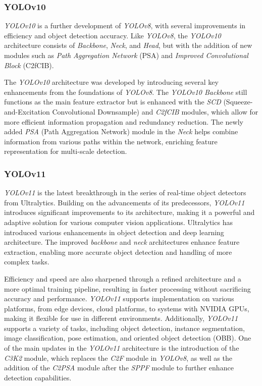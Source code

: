 \vspace{5pt}
\subsubsection{YOLOv10}
\label{subsubsec:YOLOv10}

\emph{YOLOv10} is a further development of \emph{YOLOv8}, with several improvements in efficiency and object detection accuracy. Like \emph{YOLOv8}, the \emph{YOLOv10} architecture consists of \emph{Backbone}, \emph{Neck}, and \emph{Head}, but with the addition of new modules such as \emph{Path Aggregation Network} (PSA) and \emph{Improved Convolutional Block} (C2fCIB).

The \emph{YOLOv10} architecture was developed by introducing several key enhancements from the foundations of \emph{YOLOv8}. The \emph{YOLOv10 Backbone} still functions as the main feature extractor but is enhanced with the \emph{SCD} (Squeeze-and-Excitation Convolutional Downsample) and \emph{C2fCIB} modules, which allow for more efficient information propagation and redundancy reduction. The newly added \emph{PSA} (Path Aggregation Network) module in the \emph{Neck} helps combine information from various paths within the network, enriching feature representation for multi-scale detection.

\vspace{5pt}
\subsubsection{YOLOv11}
\label{subsubsec:YOLOv11}

\emph{YOLOv11} is the latest breakthrough in the series of real-time object detectors from Ultralytics. Building on the advancements of its predecessors, \emph{YOLOv11} introduces significant improvements to its architecture, making it a powerful and adaptive solution for various computer vision applications. Ultralytics has introduced various enhancements in object detection and deep learning architecture. The improved \emph{backbone} and \emph{neck} architectures enhance feature extraction, enabling more accurate object detection and handling of more complex tasks.

Efficiency and speed are also sharpened through a refined architecture and a more optimal training pipeline, resulting in faster processing without sacrificing accuracy and performance. \emph{YOLOv11} supports implementation on various platforms, from edge devices, cloud platforms, to systems with NVIDIA GPUs, making it flexible for use in different environments. Additionally, \emph{YOLOv11} supports a variety of tasks, including object detection, instance segmentation, image classification, pose estimation, and oriented object detection (OBB). One of the main updates in the \emph{YOLOv11} architecture is the introduction of the \emph{C3K2} module, which replaces the \emph{C2F} module in \emph{YOLOv8}, as well as the addition of the \emph{C2PSA} module after the \emph{SPPF} module to further enhance detection capabilities.

